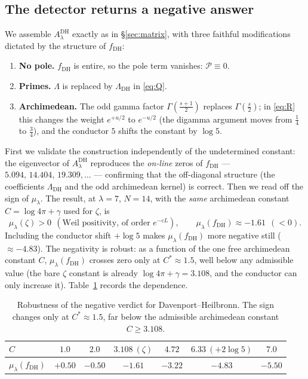 \documentclass[11pt]{amsart}
\theoremstyle{definition}
\theoremstyle{remark}
\newcommand{\lam}{\lambda}
\begin{document}
\subsection{The detector returns a negative answer}
We assemble $A_\lam^{\mathrm{DH}}$ exactly as in \S\ref{sec:matrix}, with three faithful modifications dictated by the structure of $f_{\mathrm{DH}}$:
\begin{enumerate}[label=(\arabic*),leftmargin=*]
\item \textbf{No pole.} $f_{\mathrm{DH}}$ is entire, so the pole term vanishes: $\mathcal P\equiv 0$.
\item \textbf{Primes.} $\Lambda$ is replaced by $\Lambda_{\mathrm{DH}}$ in \eqref{eq:Q}.
\item \textbf{Archimedean.} The odd gamma factor $\Gamma(\tfrac{s+1}{2})$ replaces $\Gamma(\tfrac s2)$; in \eqref{eq:R} this changes the weight $e^{+u/2}$ to $e^{-u/2}$ (the digamma argument moves from $\tfrac14$ to $\tfrac34$), and the conductor $5$ shifts the constant by $\log 5$.
\end{enumerate}

First we validate the construction independently of the undetermined constant: the eigenvector of $A_\lam^{\mathrm{DH}}$ reproduces the \emph{on-line} zeros of $f_{\mathrm{DH}}$ --- $5.094,\,14.404,\,19.309,\ldots$ --- confirming that the off-diagonal structure (the coefficients $\Lambda_{\mathrm{DH}}$ and the odd archimedean kernel) is correct. Then we read off the sign of $\mu_\lam$. The result, at $\lam=7$, $N=14$, with the \emph{same} archimedean constant $C=\log4\pi+\gamma$ used for $\zeta$, is
\[
\boxed{\ \mu_\lam(\zeta)>0\ \ (\text{Weil positivity, of order }e^{-cL}),\qquad \mu_\lam(f_{\mathrm{DH}})\approx -1.61\ \ (<0).\ }
\]
Including the conductor shift $+\log 5$ makes $\mu_\lam(f_{\mathrm{DH}})$ more negative still ($\approx -4.83$). The negativity is robust: as a function of the one free archimedean constant $C$, $\mu_\lam(f_{\mathrm{DH}})$ crosses zero only at $C^\ast\approx 1.5$, well below any admissible value (the bare $\zeta$ constant is already $\log4\pi+\gamma=3.108$, and the conductor can only increase it). Table~\ref{tab:robust} records the dependence.

\begin{table}[h]
\centering
\begin{tabular}{lcccccc}
\toprule
$C$ & $1.0$ & $2.0$ & $3.108\ (\zeta)$ & $4.72$ & $6.33\ (+2\log5)$ & $7.0$\\
\midrule
$\mu_\lam(f_{\mathrm{DH}})$ & $+0.50$ & $-0.50$ & $-1.61$ & $-3.22$ & $-4.83$ & $-5.50$\\
\bottomrule
\end{tabular}
\caption{Robustness of the negative verdict for Davenport--Heilbronn. The sign changes only at $C^\ast\approx 1.5$, far below the admissible archimedean constant $C\ge 3.108$.}\label{tab:robust}
\end{table}
\end{document}
